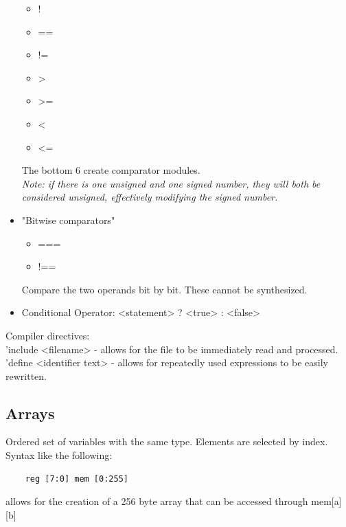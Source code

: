 \documentclass[nobib]{tufte-handout}
\begin{document}
\begin{itemize}
\begin{itemize}
                  \item !
                  \item ==
                  \item !=
                  \item >
                  \item >=
                  \item <
                  \item <=
              \end{itemize}
              The bottom 6 create comparator modules.\\
              \textit{Note: if there is one unsigned and one signed number, they will both be considered unsigned, effectively modifying the signed number.}
        \item "Bitwise comparators"
              \begin{itemize}
                  \item ===
                  \item !==
              \end{itemize}
              Compare the two operands bit by bit. These cannot be synthesized.
        \item Conditional Operator: <statement> ? <true> : <false>
    \end{itemize}
    Compiler directives:\\
    'include <filename> - allows for the file to be immediately read and processed.\\
    'define <identifier text> - allows for repeatedly used expressions to be easily rewritten.
    \subsection{Arrays}
    Ordered set of variables with the same type. Elements are selected by index.
    Syntax like the following:
    \begin{lstlisting}
    reg [7:0] mem [0:255]
\end{lstlisting}
    allows for the creation of a 256 byte array that can be accessed through
    mem[a][b]\\
\end{document}
